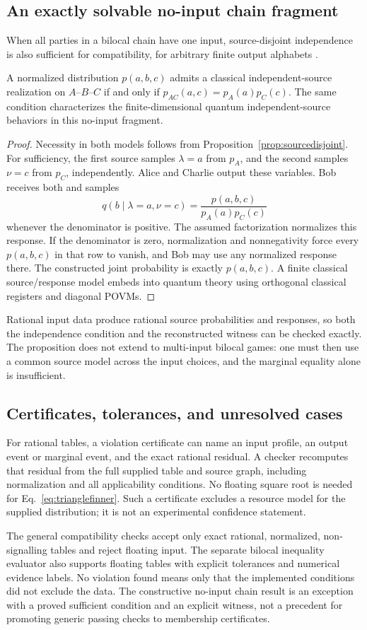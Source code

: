 \subsection{An exactly solvable no-input chain fragment}
When all parties in a bilocal chain have one input, source-disjoint
independence is also sufficient for compatibility, for arbitrary finite
output alphabets \cite{renou2019limits}.
\begin{proposition}
\label{prop:noinputbilocal}
A normalized distribution $p(a,b,c)$ admits a classical independent-source
realization on $A$--$B$--$C$ if and only if
$p_{AC}(a,c)=p_A(a)p_C(c)$. The same condition characterizes the
finite-dimensional quantum independent-source behaviors in this no-input
fragment.
\end{proposition}
\begin{proof}
Necessity in both models follows from
Proposition~\ref{prop:sourcedisjoint}. For sufficiency, the first source
samples $\lambda=a$ from $p_A$, and the second samples $\nu=c$ from $p_C$,
independently. Alice and Charlie output these variables. Bob receives both
and samples
\[
 q(b\mid\lambda=a,\nu=c)=
 \frac{p(a,b,c)}{p_A(a)p_C(c)}
\]
whenever the denominator is positive. The assumed factorization normalizes
this response. If the denominator is zero, normalization and nonnegativity
force every $p(a,b,c)$ in that row to vanish, and Bob may use any normalized
response there. The constructed joint probability is exactly $p(a,b,c)$.
A finite classical source/response model embeds into quantum theory using
orthogonal classical registers and diagonal POVMs.
\end{proof}
Rational input data produce rational source probabilities and responses, so
both the independence condition and the reconstructed witness can be checked
exactly. The proposition does not extend to multi-input bilocal games: one
must then use a common source model across the input choices, and the
marginal equality alone is insufficient.

\subsection{Certificates, tolerances, and unresolved cases}
For rational tables, a violation certificate can name an input profile, an
output event or marginal event, and the exact rational residual. A checker
recomputes that residual from the full supplied table and source graph,
including normalization and all applicability conditions. No floating square
root is needed for Eq.~\eqref{eq:trianglefinner}. Such a certificate excludes
a resource model for the supplied distribution; it is not an experimental
confidence statement.

The general compatibility checks accept only exact rational, normalized,
non-signalling tables and reject floating input. The separate bilocal
inequality evaluator also supports floating tables with explicit tolerances
and numerical evidence labels. No violation found means only that the
implemented conditions did not exclude the data. The constructive no-input chain result is an exception with a
proved sufficient condition and an explicit witness, not a precedent for
promoting generic passing checks to membership certificates.
